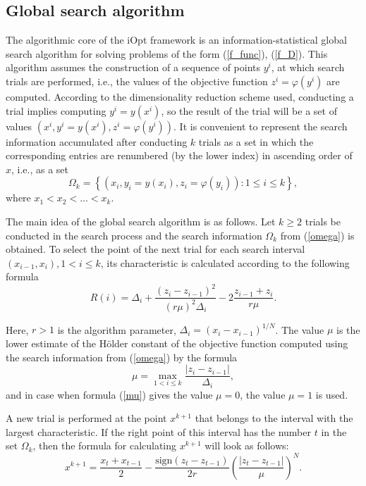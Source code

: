 \documentclass[preprint,12pt]{elsarticle}
\begin{document}
\subsection{Global search algorithm}
\label{sec_GSA}

The algorithmic core of the iOpt framework is an information-statistical global search algorithm for solving problems of the form (\ref{f_func}), (\ref{f_D}). This algorithm assumes the construction of a sequence of points $y^i$,  at which search trials are performed, i.e., the values of the objective function $z^i = \varphi(y^i)$ are computed. According to the dimensionality reduction scheme used, conducting a trial implies computing $y^i=y(x^i)$, so the result of the trial will be a set of values $(x^i, y^i=y(x^i), z^i = \varphi(y^i))$. 
It is convenient to represent the search information accumulated after conducting $k$ trials as a set in which the corresponding entries are renumbered (by the lower index) in ascending order of $x$, i.e., as a set 
\begin{equation}\label{omega}
\Omega_k = \left\{  (x_i, y_i=y(x_i), z_i = \varphi(y_i)): 1 \leq i \leq k  \right\},	
\end{equation}
where $x_1 < x_2 < ... < x_k$.

The main idea of the global search algorithm is as follows. Let $k \geq 2$ trials be conducted in the search process and the search information $\Omega_k$ from (\ref{omega}) is obtained. To select the point of the next trial for each search interval $(x_{i-1},x_i), 1<i\leq k$, its characteristic is calculated according to the following formula
\begin{equation}\label{R}
R(i) = \Delta_i + \frac{(z_i-z_{i-1})^2}{(r\mu)^2\Delta_i}-2\frac{z_{i-1}+z_i}{r\mu}.	
\end{equation}

Here,  $r>1$ is the algorithm parameter, $\Delta_i=(x_i-x_{i-1})^{1/N}$.  The value $\mu$ is the lower estimate of the H\"older constant of the objective function computed using the search information from (\ref{omega}) by the formula
\begin{equation}\label{mu}
\mu = \max_{1<i\leq k}\frac{\left|z_i-z_{i-1}\right|}{\Delta_i},
\end{equation}
and in case when formula (\ref{mu}) gives the value $\mu=0$, the value $\mu=1$ is used.

A new trial is performed at the point $x^{k+1}$ that belongs to the interval
with the largest characteristic. If the right point of this interval has the number $t$ in the set $\Omega_k$, then the formula for calculating $x^{k+1}$ will look as follows:
\begin{equation}\label{xk1}
x^{k+1} = \frac{x_t+x_{t-1}}{2}- \frac{\mathrm{sign}(z_t-z_{t-1})}{2r} \left(\frac{\left|z_t-z_{t-1}\right|}{\mu}\right)^N.   
\end{equation}
\end{document}
